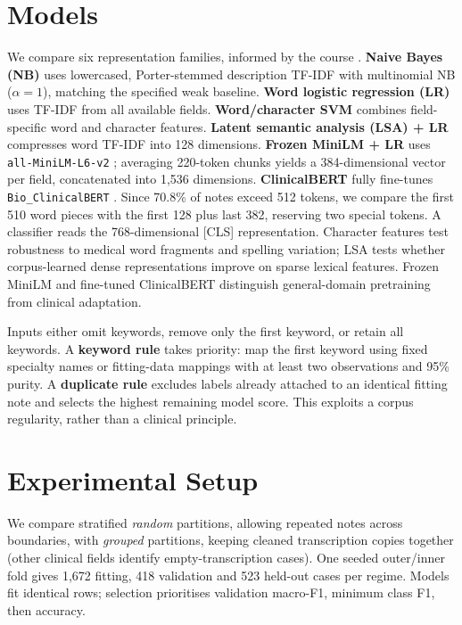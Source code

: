 \documentclass[twocolumn,10pt]{article}
\begin{document}
\section{Models}
We compare six representation families, informed by the course \cite{coheur2026}.
\textbf{Naive Bayes (NB)} uses lowercased, Porter-stemmed description TF-IDF with multinomial NB ($\alpha=1$), matching the specified weak baseline.
\textbf{Word logistic regression (LR)} uses TF-IDF from all available fields.
\textbf{Word/character SVM} combines field-specific word and character features.
\textbf{Latent semantic analysis (LSA) + LR} compresses word TF-IDF into 128 dimensions.
\textbf{Frozen MiniLM + LR} uses \texttt{all-MiniLM-L6-v2} \cite{reimers2019,wang2020,minilmcard}; averaging 220-token chunks yields a 384-dimensional vector per field, concatenated into 1,536 dimensions.
\textbf{ClinicalBERT} fully fine-tunes \texttt{Bio\_ClinicalBERT} \cite{alsentzer2019}. Since 70.8\% of notes exceed 512 tokens, we compare the first 510 word pieces with the first 128 plus last 382, reserving two special tokens. A classifier reads the 768-dimensional [CLS] representation. Character features test robustness to medical word fragments and spelling variation; LSA tests whether corpus-learned dense representations improve on sparse lexical features. Frozen MiniLM and fine-tuned ClinicalBERT distinguish general-domain pretraining from clinical adaptation.

Inputs either omit keywords, remove only the first keyword, or retain all keywords. A \textbf{keyword rule} takes priority: map the first keyword using fixed specialty names or fitting-data mappings with at least two observations and 95\% purity. A \textbf{duplicate rule} excludes labels already attached to an identical fitting note and selects the highest remaining model score. This exploits a corpus regularity, rather than a clinical principle.

\section{Experimental Setup}
We compare stratified \emph{random} partitions, allowing repeated notes across boundaries, with \emph{grouped} partitions, keeping cleaned transcription copies together (other clinical fields identify empty-transcription cases). One seeded outer/inner fold gives 1,672 fitting, 418 validation and 523 held-out cases per regime. Models fit identical rows; selection prioritises validation macro-F1, minimum class F1, then accuracy.
\end{document}
